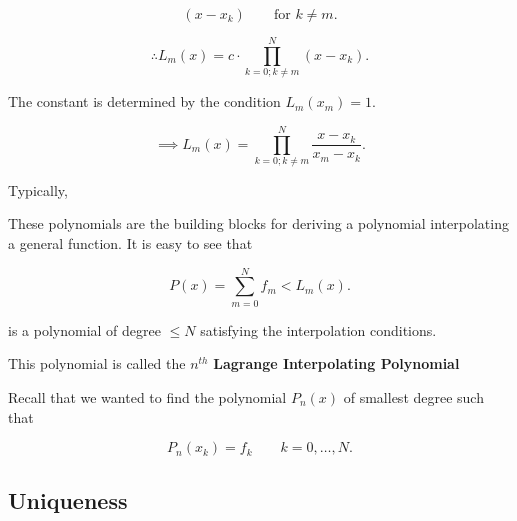 \documentclass[12pt]{article}
\begin{document}
\[
  (x-x_k) \qquad \text{for } k \neq m
.\]

\[
\therefore L_m(x) = c \cdot \prod_{k=0; k\neq m}^N(x-x_k)
.\]

The constant is determined by the condition $L_m(x_m) = 1$.

\[
\implies L_m(x) = \prod_{k=0; k\neq m}^{N}  \frac{x-x_k}{x_m-x_k}
.\]

Typically, 
\begin{center}
\end{center}

These polynomials are the building blocks for deriving a polynomial
interpolating a general function. It is easy to see that

\[
  P(x) = \sum_{m=0}^N f_m < L_m(x)
.\]

is a polynomial of degree $\leq N$ satisfying the interpolation conditions.

This polynomial is called the $n^{th}$ \textbf{Lagrange Interpolating Polynomial} 

Recall that we wanted to find the polynomial $P_n(x)$ of smallest degree such
that 

\[
  P_n(x_k) = f_k \qquad k = 0,\dots,N
.\]

\subsection{Uniqueness}
\end{document}
